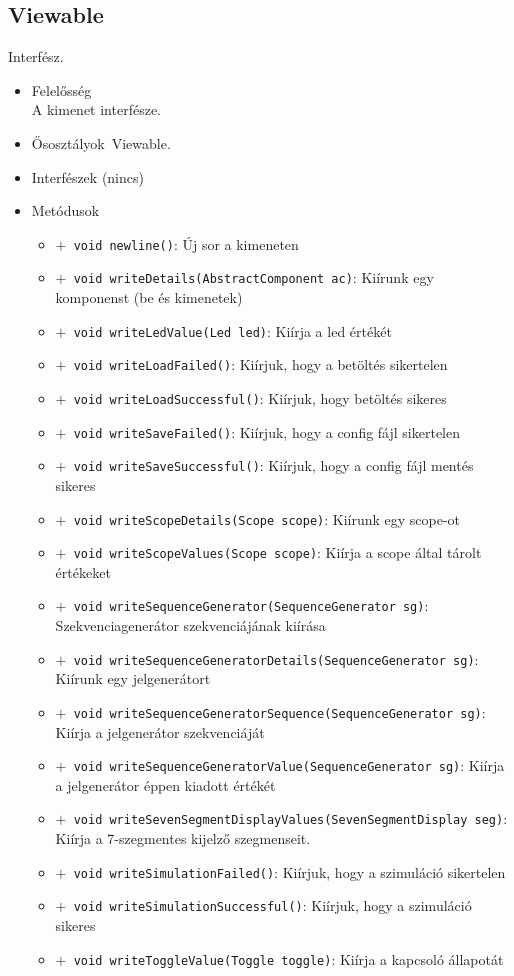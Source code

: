 \subsection{Viewable}
Interfész.
\begin{itemize}
\item Felelősség\\
A kimenet interfésze.
\item Ősosztályok\ Viewable.
\item Interfészek (nincs)
\item Metódusok$\ $
\begin{itemize}
	\item[] \texttt{$+$ void newline()}: Új sor a kimeneten
	\item[] \texttt{$+$ void writeDetails(AbstractComponent ac)}: Kiírunk egy komponenst (be és kimenetek)
	\item[] \texttt{$+$ void writeLedValue(Led led)}: Kiírja a led értékét
	\item[] \texttt{$+$ void writeLoadFailed()}: Kiírjuk, hogy a betöltés sikertelen
	\item[] \texttt{$+$ void writeLoadSuccessful()}: Kiírjuk, hogy betöltés sikeres
	\item[] \texttt{$+$ void writeSaveFailed()}: Kiírjuk, hogy a config fájl sikertelen
	\item[] \texttt{$+$ void writeSaveSuccessful()}: Kiírjuk, hogy a config fájl mentés sikeres
	\item[] \texttt{$+$ void writeScopeDetails(Scope scope)}: Kiírunk egy scope-ot
	\item[] \texttt{$+$ void writeScopeValues(Scope scope)}: Kiírja a scope által tárolt értékeket
	\item[] \texttt{$+$ void writeSequenceGenerator(SequenceGenerator sg)}: Szekvenciagenerátor szekvenciájának kiírása
	\item[] \texttt{$+$ void writeSequenceGeneratorDetails(SequenceGenerator sg)}: Kiírunk egy jelgenerátort
	\item[] \texttt{$+$ void writeSequenceGeneratorSequence(SequenceGenerator sg)}: Kiírja a jelgenerátor szekvenciáját
	\item[] \texttt{$+$ void writeSequenceGeneratorValue(SequenceGenerator sg)}: Kiírja a jelgenerátor éppen kiadott értékét
	\item[] \texttt{$+$ void writeSevenSegmentDisplayValues(SevenSegmentDisplay seg)}: Kiírja a 7-szegmentes kijelző szegmenseit.
	\item[] \texttt{$+$ void writeSimulationFailed()}: Kiírjuk, hogy a szimuláció sikertelen
	\item[] \texttt{$+$ void writeSimulationSuccessful()}: Kiírjuk, hogy a szimuláció sikeres
	\item[] \texttt{$+$ void writeToggleValue(Toggle toggle)}: Kiírja a kapcsoló állapotát
\end{itemize}
\end{itemize}

